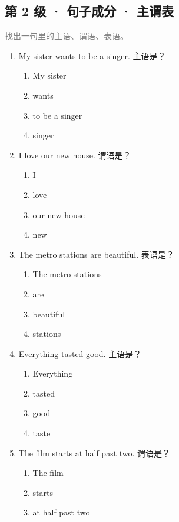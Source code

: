 \documentclass[11pt,a4paper]{ctexart}
\begin{document}
\subsection*{第 2 级 · 句子成分 · 主谓表}
\noindent\textcolor{gray}{找出一句里的主语、谓语、表语。}\par\smallskip
\begin{enumerate}[leftmargin=*,itemsep=4pt]
\item My sister wants to be a singer. 主语是？
\begin{enumerate}[label=\Alph*.,leftmargin=2em,itemsep=1pt,topsep=2pt]
\item My sister
\item wants
\item to be a singer
\item singer
\end{enumerate}
\item I love our new house. 谓语是？
\begin{enumerate}[label=\Alph*.,leftmargin=2em,itemsep=1pt,topsep=2pt]
\item I
\item love
\item our new house
\item new
\end{enumerate}
\item The metro stations are beautiful. 表语是？
\begin{enumerate}[label=\Alph*.,leftmargin=2em,itemsep=1pt,topsep=2pt]
\item The metro stations
\item are
\item beautiful
\item stations
\end{enumerate}
\item Everything tasted good. 主语是？
\begin{enumerate}[label=\Alph*.,leftmargin=2em,itemsep=1pt,topsep=2pt]
\item Everything
\item tasted
\item good
\item taste
\end{enumerate}
\item The film starts at half past two. 谓语是？
\begin{enumerate}[label=\Alph*.,leftmargin=2em,itemsep=1pt,topsep=2pt]
\item The film
\item starts
\item at half past two

\end{enumerate}
\end{enumerate}
\end{document}
